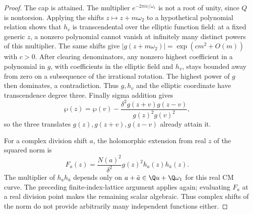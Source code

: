 \begin{proof}
The cap is attained.  The multiplier
$e^{-2\pi iv/\omega_1}$ is not a root of unity, since $Q$
is nontorsion.  Applying the shifts $z\mapsto z+m\omega_2$
to a hypothetical polynomial relation shows that $h_v$ is
transcendental over the elliptic function field: at a fixed
generic $z$, a nonzero polynomial cannot vanish at infinitely
many distinct powers of this multiplier.  The same shifts
give $|g(z+m\omega_2)|=\exp(c m^2+O(m))$ with $c>0$.
After clearing denominators, any nonzero highest coefficient in
a polynomial in $g$, with coefficients in the elliptic field and
$h_v$, stays bounded
away from zero on a subsequence of the irrational rotation.
The highest power of $g$ then dominates, a contradiction.
Thus $g,h_v$ and the elliptic coordinate have transcendence
degree three.  Finally sigma addition gives
\[
 \wp(z)=\wp(v)-
 \frac{\delta^2g(z+v)g(z-v)}{g(z)^2g(v)^2},
\]
so the three translates $g(z),g(z+v),g(z-v)$ already attain it.

For a complex division shift $a$, the holomorphic extension
from real $z$ of the squared norm is
\[
 F_a(z)=\frac{N(a)^2}{\delta^2}
                  g(z)^2h_a(z)h_{\bar a}(z).
\]
The multiplier of $h_ah_{\bar a}$ depends only on
$a+\bar a\in\Q u+\Q\omega_1$ for this real CM curve.
The preceding finite-index-lattice argument applies again;
evaluating $F_a$ at a real division point makes the remaining
scalar algebraic.  Thus complex shifts of the norm do not
provide arbitrarily many independent functions either.


\end{proof}
